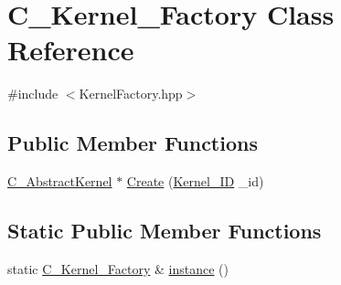 \hypertarget{class_c___kernel___factory}{\section{C\-\_\-\-Kernel\-\_\-\-Factory Class Reference}
\label{class_c___kernel___factory}
}


{\ttfamily \#include $<$Kernel\-Factory.\-hpp$>$}

\subsection*{Public Member Functions}
\begin{DoxyCompactItemize}
\item 
\hyperlink{class_c___abstract_kernel}{C\-\_\-\-Abstract\-Kernel} $\ast$ \hyperlink{class_c___kernel___factory_a4e0263fb3805d2abf65c45d12ac2365e}{Create} (\hyperlink{_abstract_kernel_8hpp_acee766998fbe394072b4d2fe1eb50e62}{Kernel\-\_\-\-I\-D} \-\_\-id)
\end{DoxyCompactItemize}
\subsection*{Static Public Member Functions}
\begin{DoxyCompactItemize}
\item 
static \hyperlink{class_c___kernel___factory}{C\-\_\-\-Kernel\-\_\-\-Factory} \& \hyperlink{class_c___kernel___factory_aec66c34d2fb1224aadda12ea4865e281}{instance} ()
\end{DoxyCompactItemize}


